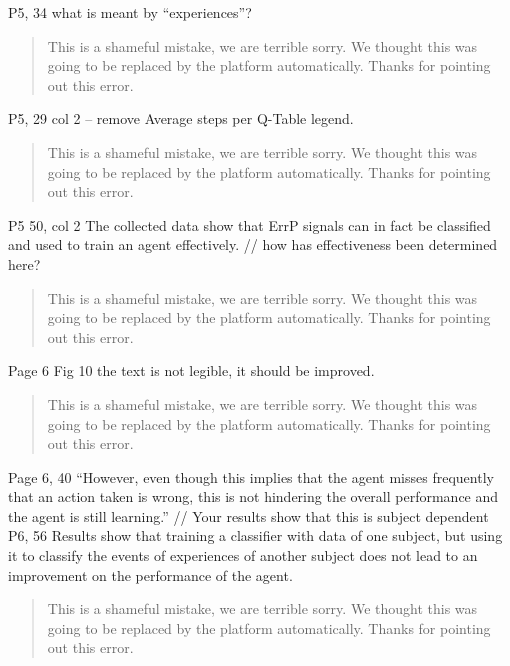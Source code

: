 \documentclass[journal,onecolumn,12pt]{IEEEtran}
\begin{document}
P5, 34 what is meant by “experiences”?

\begin{quotation}
{\color{blue}
This is a shameful mistake, we are terrible sorry.  We thought this was going to be replaced by the platform automatically. Thanks for pointing out this error.
}
\end{quotation}

P5, 29 col 2 – remove Average steps per Q-Table legend.

\begin{quotation}
{\color{blue}
This is a shameful mistake, we are terrible sorry.  We thought this was going to be replaced by the platform automatically. Thanks for pointing out this error.
}
\end{quotation}

P5 50, col 2 The collected data show that ErrP signals can in fact be classified and used to train an agent effectively.
// how has effectiveness been determined here?

\begin{quotation}
{\color{blue}
This is a shameful mistake, we are terrible sorry.  We thought this was going to be replaced by the platform automatically. Thanks for pointing out this error.
}
\end{quotation}

Page 6 Fig 10 the text is not legible, it should be improved.

\begin{quotation}
{\color{blue}
This is a shameful mistake, we are terrible sorry.  We thought this was going to be replaced by the platform automatically. Thanks for pointing out this error.
}
\end{quotation}

Page 6, 40
“However, even though this implies that the agent misses frequently that an action taken is wrong, this is not hindering the overall performance and the agent is still learning.”
// Your results show that this is subject dependent
P6, 56
Results show that training a classifier with data of one subject, but using it
to classify the events of experiences of another subject does
not lead to an improvement on the performance of the agent.

\begin{quotation}
{\color{blue}
This is a shameful mistake, we are terrible sorry.  We thought this was going to be replaced by the platform automatically. Thanks for pointing out this error.
}
\end{quotation}
\end{document}
